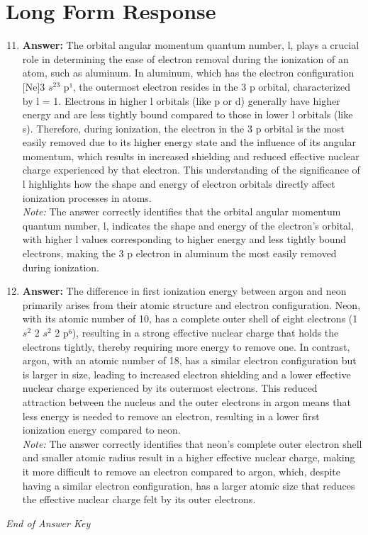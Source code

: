 \documentclass[12pt]{article}
\begin{document}
\section*{Long Form Response}
\begin{enumerate}[label=\arabic*.]
\setcounter{enumi}{10}
\item \textbf{Answer:} The orbital angular momentum quantum number, l, plays a crucial role in determining the ease of electron removal during the ionization of an atom, such as aluminum. In aluminum, which has the electron configuration [Ne]3 $s^23$ p¹, the outermost electron resides in the 3 p orbital, characterized by l = 1. Electrons in higher l orbitals (like p or d) generally have higher energy and are less tightly bound compared to those in lower l orbitals (like s). Therefore, during ionization, the electron in the 3 p orbital is the most easily removed due to its higher energy state and the influence of its angular momentum, which results in increased shielding and reduced effective nuclear charge experienced by that electron. This understanding of the significance of l highlights how the shape and energy of electron orbitals directly affect ionization processes in atoms.
\\ \textit{Note:} The answer correctly identifies that the orbital angular momentum quantum number, l, indicates the shape and energy of the electron's orbital, with higher l values corresponding to higher energy and less tightly bound electrons, making the 3 p electron in aluminum the most easily removed during ionization.
\item \textbf{Answer:} The difference in first ionization energy between argon and neon primarily arises from their atomic structure and electron configuration. Neon, with its atomic number of 10, has a complete outer shell of eight electrons (1 $s^2$ 2 $s^2$ 2 p⁶), resulting in a strong effective nuclear charge that holds the electrons tightly, thereby requiring more energy to remove one. In contrast, argon, with an atomic number of 18, has a similar electron configuration but is larger in size, leading to increased electron shielding and a lower effective nuclear charge experienced by its outermost electrons. This reduced attraction between the nucleus and the outer electrons in argon means that less energy is needed to remove an electron, resulting in a lower first ionization energy compared to neon.
\\ \textit{Note:} The answer correctly identifies that neon's complete outer electron shell and smaller atomic radius result in a higher effective nuclear charge, making it more difficult to remove an electron compared to argon, which, despite having a similar electron configuration, has a larger atomic size that reduces the effective nuclear charge felt by its outer electrons.
\end{enumerate}

\vfill
\noindent\textit{End of Answer Key}
\end{document}
